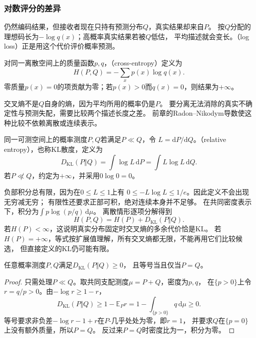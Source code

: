 \subsubsection{对数评分的差异}
\label{sec:information-log-score-kl}

仍然编码结果，但接收者现在只持有预测分布\(Q\)，真实结果却来自\(P\)。
按\(Q\)分配的理想码长为\(-\log q(x)\)；高概率真实结果若被\(Q\)低估，
平均描述就会变长。（log loss）正是用这个代价评价概率预测。

\begin{definition}[离散交叉熵]
\label{def:information-cross-entropy}
对同一离散空间上的质量函数\(p,q\)，（cross-entropy）定义为
\begin{equation}
  H(P,Q)=-\sum_xp(x)\log q(x).
  \label{eq:information-cross-entropy}
\end{equation}
零质量\(p(x)=0\)的项贡献为零；若\(p(x)>0\)而\(q(x)=0\)，则结果为\(+\infty\)。
\end{definition}

交叉熵不是\(Q\)自身的熵，因为平均所用的概率仍是\(P\)。
要分离无法消除的真实不确定性与预测失配，需要比较两个描述长度之差。
前章的Radon--Nikodym导数使这种比较不依赖离散或连续表示。

\begin{definition}[相对熵]
\label{def:information-kl-divergence}
同一可测空间上的概率测度\(P,Q\)若满足\(P\ll Q\)，令
\(L=\mathrm dP/\mathrm dQ\)。（relative entropy），也称KL散度，定义为
\begin{equation}
  D_{\mathrm{KL}}(P\Vert Q)
  =\int\log L\,\mathrm dP=\int L\log L\,\mathrm dQ.
  \label{eq:information-kl-divergence}
\end{equation}
若\(P\not\ll Q\)，约定为\(+\infty\)，并采用\(0\log0=0\)。
\end{definition}

负部积分总有限，因为在\(0\leq L\leq1\)上有
\(0\leq-L\log L\leq1/e\)。因此定义不会出现无穷减无穷；
有限性还要求正部可积，绝对连续本身并不足够。
在共同密度表示下，积分为\(\int p\log(p/q)\,\mathrm d\mu\)。
离散情形逐项分解得到
\begin{equation}
  H(P,Q)=H(P)+D_{\mathrm{KL}}(P\Vert Q).
  \label{eq:information-cross-entropy-decomposition}
\end{equation}
若\(H(P)<\infty\)，这说明真实分布固定时交叉熵的多余代价恰是KL。
若\(H(P)=+\infty\)，等式按扩展值理解，所有交叉熵都无限，不能再用它们比较候选，
但直接定义的KL仍可能有限。

\begin{theorem}[Gibbs不等式]
\label{thm:information-gibbs-inequality}
任意概率测度\(P,Q\)满足\(D_{\mathrm{KL}}(P\Vert Q)\geq0\)，
且等号当且仅当\(P=Q\)。
\end{theorem}
\begin{proof}
只需处理\(P\ll Q\)。取共同支配测度\(\mu=P+Q\)，密度为\(p,q\)，
在\(\{p>0\}\)上令\(r=q/p>0\)。由\(-\log r\geq1-r\)，
\[
  D_{\mathrm{KL}}(P\Vert Q)
  \geq1-\mathbb E_Pr
  =1-\int_{\{p>0\}}q\,\mathrm d\mu\geq0.
\]
等号要求非负差\(-\log r-1+r\)在\(P\)-几乎处处为零，即\(r=1\)，
并要求\(Q\)在\(\{p=0\}\)上没有额外质量，所以\(P=Q\)。
反过来\(P=Q\)时密度比为一，积分为零。
\end{proof}

